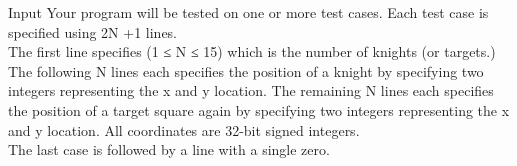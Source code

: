 Input
Your program will be tested on one or more test cases. Each test case is specified using 2N +1 lines.
\\The first line specifies (1 ≤ N ≤ 15) which is the number of knights (or targets.) The following N lines each specifies the position of a knight by specifying two integers representing the x and y location. The remaining N lines each specifies the position of a target square again by specifying two integers representing the x and y location. All coordinates are 32-bit signed integers.
\\The last case is followed by a line with a single zero.